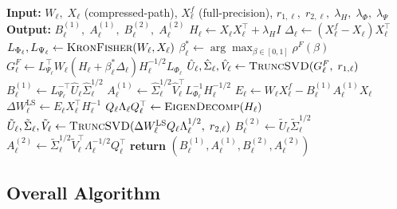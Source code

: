\documentclass[a4paper,fleqn]{cas-dc}
\begin{document}
\begin{algorithm}[t]
\caption{FR-SVD compression for layer $\ell$}
\label{alg:frsvd-layer}
\small
\begin{algorithmic}[1]
\State \textbf{Input:}\; $W_\ell,\; X_\ell$ (compressed-path), $X_\ell^f$ (full-precision),
\Statex \hspace{3.2em} $r_{1,\ell},\; r_{2,\ell},\; \lambda_H,\; \lambda_\Phi,\; \lambda_\Psi$
\State \textbf{Output:}\; $B_\ell^{(1)},\; A_\ell^{(1)},\; B_\ell^{(2)},\; A_\ell^{(2)}$
        \State $H_\ell \gets X_\ell X_\ell^\top + \lambda_H I$
        \State $\Delta_\ell \gets (X_\ell^f - X_\ell)X_\ell^\top$ 
        \State $L_{\Phi_\ell}, L_{\Psi_\ell} \gets \Call{KronFisher}{W_\ell, X_\ell}$ 
        \State $\beta_\ell^* \gets \arg\max_{\beta \in [0,1]} \rho^F(\beta)$ 
        \State $G_\ell^F \gets L_{\Psi_\ell}^\top W_\ell (H_\ell + \beta_\ell^*\Delta_\ell) H_\ell^{-1/2} L_{\Phi_\ell}$ 
        \State $\hat{U}_\ell, \hat{\Sigma}_\ell, \hat{V}_\ell \gets \Call{TruncSVD}{G_\ell^F,\; r_{1,\ell}}$ 
        \State $B_\ell^{(1)} \gets L_{\Psi_\ell}^{-\top} \hat{U}_\ell \hat{\Sigma}_\ell^{1/2}$
        \State $A_\ell^{(1)} \gets \hat{\Sigma}_\ell^{1/2} \hat{V}_\ell^\top L_{\Phi_\ell}^{-1} H_\ell^{-1/2}$ 
    \EndStage
        \State $E_\ell \gets W_\ell X_\ell^f - B_\ell^{(1)} A_\ell^{(1)} X_\ell$ 
        \State $\Delta W_\ell^{\mathrm{LS}} \gets E_\ell X_\ell^\top H_\ell^{-1}$
        \State $Q_\ell \Lambda_\ell Q_\ell^\top \gets \Call{EigenDecomp}{H_\ell}$
        \State $\tilde{U}_\ell, \tilde{\Sigma}_\ell, \tilde{V}_\ell \gets \Call{TruncSVD}{\Delta W_\ell^{\mathrm{LS}} Q_\ell \Lambda_\ell^{1/2},\; r_{2,\ell}}$ 
        \State $B_\ell^{(2)} \gets \tilde{U}_\ell \tilde{\Sigma}_\ell^{1/2}$
        \State $A_\ell^{(2)} \gets \tilde{\Sigma}_\ell^{1/2} \tilde{V}_\ell^\top \Lambda_\ell^{-1/2} Q_\ell^\top$
    \EndStage
\EndFor
\State \textbf{return} $(B_\ell^{(1)}, A_\ell^{(1)}, B_\ell^{(2)}, A_\ell^{(2)})$
\end{algorithmic}
\end{algorithm}

\subsection{Overall Algorithm}
\end{document}
